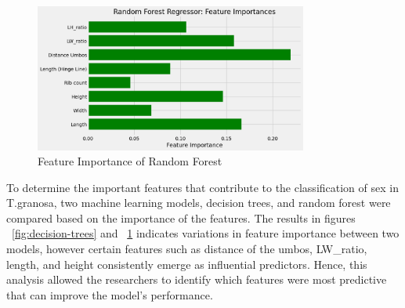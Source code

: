 \begin{figure}[!htbp]
	\centering
	\includegraphics[width=0.8\textwidth]{figures/random-forest.png}
	\caption{Feature Importance of Random Forest}
	\label{fig:random-forest}
\end{figure}

To determine the important features that contribute to the classification of sex in T.granosa, two machine learning models, decision trees, and random forest were compared based on the importance of the features. The results in figures ~\ref{fig:decision-trees} and ~\ref{fig:random-forest} indicates variations in feature importance between two models, however certain features such as distance of the umbos, LW\_ratio, length, and height consistently emerge as influential predictors. Hence, this analysis allowed the researchers to identify which features were most predictive that can improve the model’s performance. 

